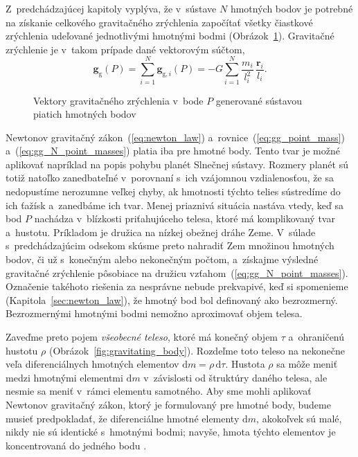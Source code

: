 \documentclass[a4paper, 12pt]{book}
\newcommand{\diff}{\mathrm d}
\newcommand{\gidx}{\mathrm g}
\let\vec\mathbf
\begin{document}
Z~predchádzajúcej kapitoly vyplýva, že v~sústave $N$ hmotných bodov je potrebné 
na získanie celkového gravitačného zrýchlenia započítať všetky čiastkové 
zrýchlenia udeľované jednotlivými hmotnými bodmi 
(Obrázok~\ref{fig:gg_n_point_masses}).  Gravitačné zrýchlenie je v~takom 
prípade dané vektorovým súčtom,
%
\begin{equation}
\label{eq:gg_N_point_masses}
\vec g_\gidx(P) = \sum_{i = 1}^{N}\vec g_{\gidx,i}(P) = -G \sum_{i = 1}^{N} 
\frac{m_i}{l_i^2} \, \frac{\vec r_i}{l_i}{.}
\end{equation}

\begin{figure}[b]
\centering

\caption{Vektory gravitačného zrýchlenia v~bode $P$ generované sústavou piatich 
hmotných bodov}
\label{fig:gg_n_point_masses}
\end{figure}

Newtonov gravitačný zákon~(\ref{eq:newton_law}) 
a~rovnice~(\ref{eq:gg_point_mass}) 
a~(\ref{eq:gg_N_point_masses}) platia iba pre hmotné body.  
Tento tvar je možné aplikovať napríklad na popis pohybu planét Slnečnej 
sústavy.  Rozmery planét sú totiž natoľko zanedbateľné v~porovnaní s~ich 
vzájomnou vzdialenosťou, že sa nedopustíme nerozumne veľkej chyby, ak hmotnosti 
týchto telies sústredíme do ich ťažísk a~zanedbáme ich tvar.  Menej priaznivá 
situácia nastáva vtedy, keď sa bod $P$ nachádza v~blízkosti priťahujúceho 
telesa, ktoré má komplikovaný tvar a~hustotu.  Príkladom je družica na nízkej 
obežnej dráhe Zeme.  V~súlade s~predchádzajúcim odsekom skúsme preto nahradiť 
Zem množinou hmotných bodov, či už s~konečným alebo nekonečným počtom, 
a~získajme výsledné gravitačné zrýchlenie pôsobiace na družicu 
vzťahom~(\ref{eq:gg_N_point_masses}).  Označenie takéhoto 
riešenia za nesprávne nebude prekvapivé, keď si spomenieme 
(Kapitola~\ref{sec:newton_law}), že hmotný bod bol definovaný 
ako bezrozmerný.  Bezrozmernými hmotnými bodmi nemožno aproximovať objem 
telesa.

Zaveďme preto pojem \emph{všeobecné teleso}, ktoré má konečný objem $\tau$ 
a~ohraničenú hustotu $\rho$ (Obrázok~\ref{fig:gravitating_body}).  Rozdeľme 
toto teleso na nekonečne veľa diferenciálnych hmotných elementov $\diff 
m = \rho \, \diff \tau$.  Hustota $\rho$ sa môže meniť medzi hmotnými elementmi 
$\diff m$ v~závislosti od štruktúry daného telesa, ale nesmie sa meniť v~rámci 
elementu samotného.  Aby sme mohli aplikovať Newtonov gravitačný zákon, ktorý 
je formulovaný pre hmotné body, budeme musieť predpokladať, že diferenciálne 
hmotné elementy $\diff m$, akokoľvek sú malé, nikdy nie sú identické s~hmotnými 
bodmi; navyše, hmota týchto elementov je koncentrovaná do jedného bodu 
\citep{Kellogg1967}.
\end{document}
